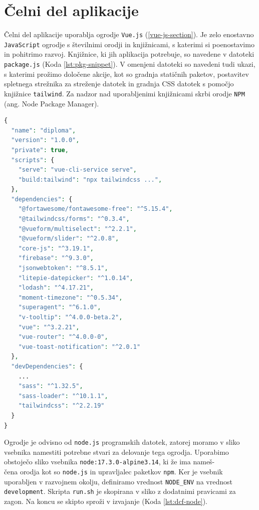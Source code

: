 \section{Čelni del aplikacije}
Čelni del aplikacije uporablja ogrodje \verb=Vue.js= (\ref{vue-js-section}). Je zelo enostavno \verb=JavaScript= ogrodje s številnimi orodji in knjižnicami, s katerimi si poenostavimo in pohitrimo razvoj. Knjižnice, ki jih aplikacija potrebuje, so navedene v datoteki \verb=package.js= (Koda \ref{lst:pkg-snippet}). V omenjeni datoteki so navedeni tudi ukazi, s katerimi prožimo določene akcije, kot so gradnja statičnih paketov, postavitev spletnega strežnika za streženje datotek in gradnja CSS datotek s pomočjo knjižnice \verb=tailwind=. Za nadzor nad uporabljenimi knjižnicami skrbi orodje \verb=NPM= (ang. Node Package Manager).

\begin{lstlisting}[language=php, style=mystyle,caption={Izsek naštetih knjižnic in ukazov v datoteki package.json.},label=lst:pkg-snippet]
{
  "name": "diploma",
  "version": "1.0.0",
  "private": true,
  "scripts": {
    "serve": "vue-cli-service serve",
    "build:tailwind": "npx tailwindcss ...",
  },
  "dependencies": {
    "@fortawesome/fontawesome-free": "^5.15.4",
    "@tailwindcss/forms": "^0.3.4",
    "@vueform/multiselect": "^2.2.1",
    "@vueform/slider": "^2.0.8",
    "core-js": "^3.19.1",
    "firebase": "^9.3.0",
    "jsonwebtoken": "^8.5.1",
    "litepie-datepicker": "^1.0.14",
    "lodash": "^4.17.21",
    "moment-timezone": "^0.5.34",
    "superagent": "^6.1.0",
    "v-tooltip": "^4.0.0-beta.2",
    "vue": "^3.2.21",
    "vue-router": "^4.0.0-0",
    "vue-toast-notification": "^2.0.1"
  },
  "devDependencies": {
    ...
    "sass": "^1.32.5",
    "sass-loader": "^10.1.1",
    "tailwindcss": "^2.2.19"
  }
}
\end{lstlisting}



Ogrodje je odvisno od \verb=node.js= programskih datotek, zatorej moramo v sliko vsebnika namestiti potrebne stvari za delovanje tega ogrodja. Uporabimo obstoječo sliko vsebnika \texttt{node:17.3.0-alpine3.14}, ki že ima nameš-\\čena orodja kot so \texttt{node.js} in upravljalec paketkov \texttt{npm}. Ker je vsebnik uporabljen v razvojnem okolju, definiramo vrednost \texttt{NODE\_ENV} na vrednost \texttt{development}. Skripta \texttt{run.sh} je skopirana v sliko z dodatnimi pravicami za zagon. Na koncu se skipto sproži v izvajanje (Koda \ref{lst:dcf-node}).

